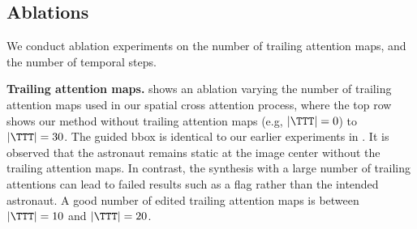 
\subsection{Ablations}
\label{sec:ablation}

We conduct ablation experiments on the number of trailing attention maps, and the number of temporal steps.


\textbf{Trailing attention maps.}  shows an ablation varying the number of trailing attention maps used in our spatial cross attention process, where the top row shows our method without trailing attention maps (e.g, $|\TTT|=0$) to $|\TTT|=30$. The guided bbox is identical to our earlier experiments in . It is observed that the astronaut remains static at the image center without the trailing attention maps. In contrast, the synthesis with a large number of trailing attentions can lead to failed results such as a flag rather than the intended astronaut. A good number of edited trailing attention maps is between $|\TTT|=10$ and $|\TTT|=20$.






